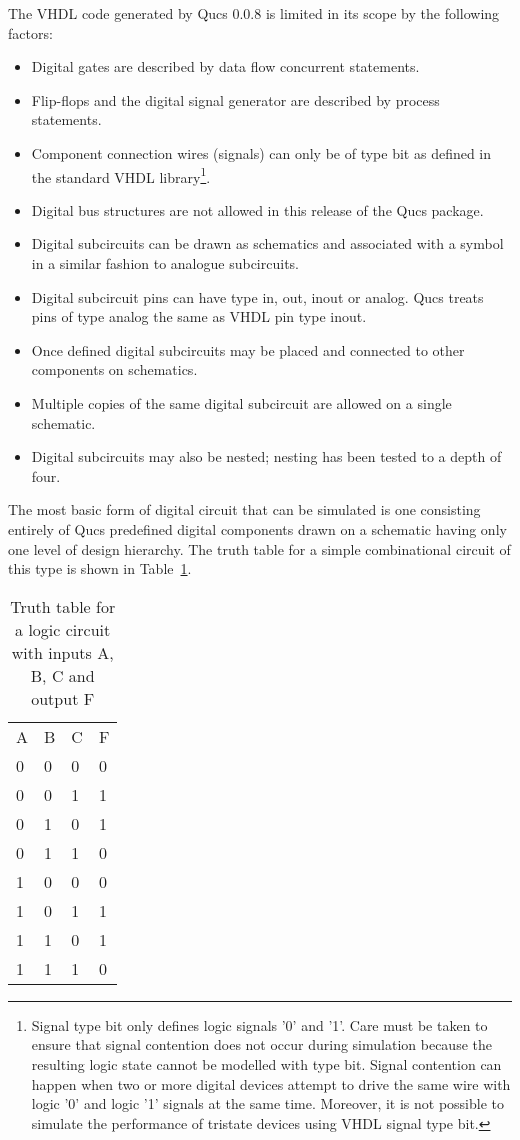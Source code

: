 \addvspace{12pt}

The VHDL code generated by Qucs 0.0.8 is limited in its scope by the
following factors:
\begin{itemize}
\item
Digital gates are described by data flow concurrent statements.
\item
Flip-flops and the digital signal generator are described by process
statements.
\item
Component connection wires (signals) can only be of type bit as
defined in the standard VHDL library\footnote{Signal type bit only
defines logic signals '0' and '1'.  Care must be taken to ensure that
signal contention does not occur during simulation because the
resulting logic state cannot be modelled with type bit. Signal
contention can happen when two or more digital devices attempt to
drive the same wire with logic '0' and logic '1' signals at the same
time.  Moreover, it is not possible to simulate the performance of
tristate devices using VHDL signal type bit.}.
\item
Digital bus structures are not allowed in this release of the Qucs
package.
\item
Digital subcircuits can be drawn as schematics and associated with a
symbol in a similar fashion to analogue subcircuits.
\item
Digital subcircuit pins can have type in, out, inout or analog.  Qucs
treats pins of type analog the same as VHDL pin type inout.
\item
Once defined digital subcircuits may be placed and connected to other
components on schematics.
\item
Multiple copies of the same digital subcircuit are allowed on a single
schematic.
\item
Digital subcircuits may also be nested; nesting has been tested to a
depth of four.


\end{itemize}


The most basic form of digital circuit that can be simulated is one
consisting entirely of Qucs predefined digital components drawn on a
schematic having only one level of design hierarchy.  The truth table
for a simple combinational circuit of this type is shown in
Table~\ref{tab:tab1}.

\begin{table}
\centering
\begin{tabular}{llll}
A & B & C & F \\ 
0 & 0 & 0 & 0 \\ 
0 & 0 & 1 & 1 \\ 
0 & 1 & 0 & 1 \\ 
0 & 1 & 1 & 0 \\ 
1 & 0 & 0 & 0 \\ 
1 & 0 & 1 & 1 \\ 
1 & 1 & 0 & 1 \\ 
1 & 1 & 1 & 0
\end{tabular}
\caption{Truth table for a logic circuit with inputs A, B, C and output F}
\label{tab:tab1}
\end{table}

